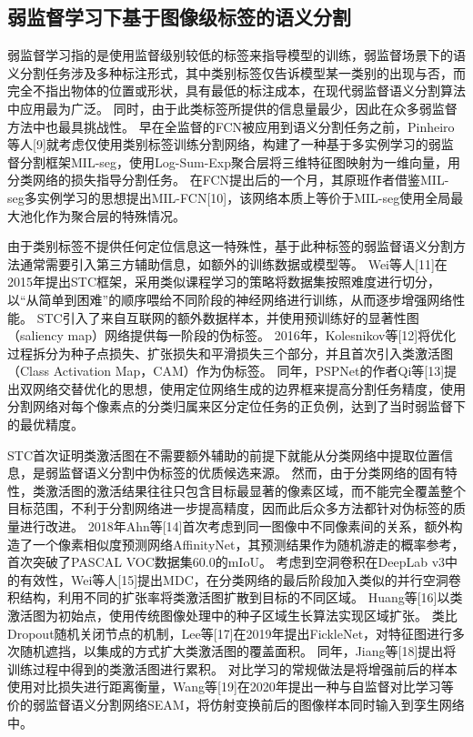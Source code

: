 \subsection{弱监督学习下基于图像级标签的语义分割}
弱监督学习指的是使用监督级别较低的标签来指导模型的训练，弱监督场景下的语义分割任务涉及多种标注形式，其中类别标签仅告诉模型某一类别的出现与否，而完全不指出物体的位置或形状，具有最低的标注成本，在现代弱监督语义分割算法中应用最为广泛。
同时，由于此类标签所提供的信息量最少，因此在众多弱监督方法中也最具挑战性。
早在全监督的FCN被应用到语义分割任务之前，Pinheiro等人[9]就考虑仅使用类别标签训练分割网络，构建了一种基于多实例学习的弱监督分割框架MIL-seg，使用Log-Sum-Exp聚合层将三维特征图映射为一维向量，用分类网络的损失指导分割任务。
在FCN提出后的一个月，其原班作者借鉴MIL-seg多实例学习的思想提出MIL-FCN[10]，该网络本质上等价于MIL-seg使用全局最大池化作为聚合层的特殊情况。
\par
由于类别标签不提供任何定位信息这一特殊性，基于此种标签的弱监督语义分割方法通常需要引入第三方辅助信息，如额外的训练数据或模型等。
Wei等人[11]在2015年提出STC框架，采用类似课程学习的策略将数据集按照难度进行切分，以“从简单到困难”的顺序喂给不同阶段的神经网络进行训练，从而逐步增强网络性能。
STC引入了来自互联网的额外数据样本，并使用预训练好的显著性图（saliency map）网络提供每一阶段的伪标签。
2016年，Kolesnikov等[12]将优化过程拆分为种子点损失、扩张损失和平滑损失三个部分，并且首次引入类激活图（Class Activation Map，CAM）作为伪标签。
同年，PSPNet的作者Qi等[13]提出双网络交替优化的思想，使用定位网络生成的边界框来提高分割任务精度，使用分割网络对每个像素点的分类归属来区分定位任务的正负例，达到了当时弱监督下的最优精度。
\par
STC首次证明类激活图在不需要额外辅助的前提下就能从分类网络中提取位置信息，是弱监督语义分割中伪标签的优质候选来源。
然而，由于分类网络的固有特性，类激活图的激活结果往往只包含目标最显著的像素区域，而不能完全覆盖整个目标范围，不利于分割网络进一步提高精度，因而此后众多方法都针对伪标签的质量进行改进。
2018年Ahn等[14]首次考虑到同一图像中不同像素间的关系，额外构造了一个像素相似度预测网络AffinityNet，其预测结果作为随机游走的概率参考，首次突破了PASCAL VOC数据集60.0的mIoU。
考虑到空洞卷积在DeepLab v3中的有效性，Wei等人[15]提出MDC，在分类网络的最后阶段加入类似的并行空洞卷积结构，利用不同的扩张率将类激活图扩散到目标的不同区域。
Huang等[16]以类激活图为初始点，使用传统图像处理中的种子区域生长算法实现区域扩张。
类比Dropout随机关闭节点的机制，Lee等[17]在2019年提出FickleNet，对特征图进行多次随机遮挡，以集成的方式扩大类激活图的覆盖面积。
同年，Jiang等[18]提出将训练过程中得到的类激活图进行累积。
对比学习的常规做法是将增强前后的样本使用对比损失进行距离衡量，Wang等[19]在2020年提出一种与自监督对比学习等价的弱监督语义分割网络SEAM，将仿射变换前后的图像样本同时输入到孪生网络中。
